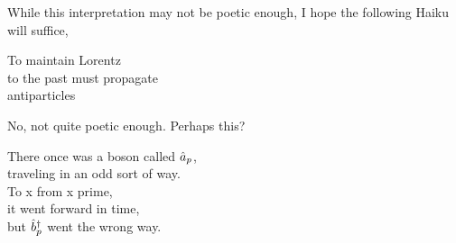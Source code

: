 \documentclass[12pt]{extarticle}
\begin{document}
While this interpretation may not be poetic enough, I hope the following Haiku will suffice, \\
\begin{center}
To maintain Lorentz\\
to the past must propagate \\
antiparticles
\end{center}
No, not quite poetic enough. Perhaps this?
\begin{center}
There once was a boson called $\hat{a}_p$, \\
traveling in an odd sort of way. \\
To x from x prime, \\
it went forward in time, \\
but $\hat{b}^\dagger_p$ went the wrong way. 
\end{center}
\end{document}
